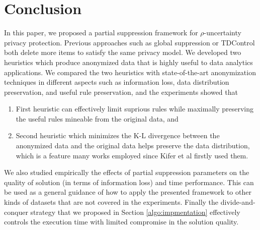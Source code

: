 \section{Conclusion}
\label{sec:conclude}
In this paper, we proposed a partial suppression framework for
$\rho$-uncertainty privacy protection. Previous approaches such as
global suppression or TDControl both delete more items to satisfy the same privacy model. We developed two heuristics which produce anonymized data that is highly useful to data analytics applications.
We compared the two heuristics with state-of-the-art anonymization techniques
in different aspects such as information loss, data distribution preservation, and useful rule preservation, and the experiments showed that
\begin{enumerate}
\item First heuristic can effectively limit suprious rules while
maximally preserving the useful rules mineable from the original data, and
\item Second heuristic which minimizes the K-L divergence between the
anonymized data and the original data helps preserve the data distribution,
which is a feature many works employed since Kifer et al \cite{Kifer:l-diversity} firstly used them.
\end{enumerate}
We also studied empirically the effects of partial suppression parameters
on the quality of solution (in terms of information loss) and time performance.
This can be used as a general guidance of how to apply the presented framework to other kinds of datasets that are not covered in the experiments. Finally the divide-and-conquer strategy that we proposed in 
Section \ref{algo:impmentation}
effectively controls the execution time with limited compromise in the solution quality.
